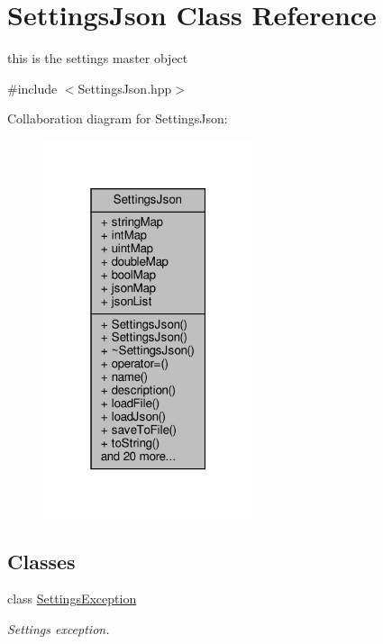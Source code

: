 \hypertarget{class_settings_json}{}\section{Settings\+Json Class Reference}
\label{class_settings_json}


this is the settings master object  




{\ttfamily \#include $<$Settings\+Json.\+hpp$>$}



Collaboration diagram for Settings\+Json\+:
\nopagebreak
\begin{figure}[H]
\begin{center}
\leavevmode
\includegraphics[width=175pt]{class_settings_json__coll__graph}
\end{center}
\end{figure}
\subsection*{Classes}
\begin{DoxyCompactItemize}
\item 
class \hyperlink{class_settings_json_1_1_settings_exception}{Settings\+Exception}
\begin{DoxyCompactList}\small\item\em Settings exception. \end{DoxyCompactList}\end{DoxyCompactItemize}
